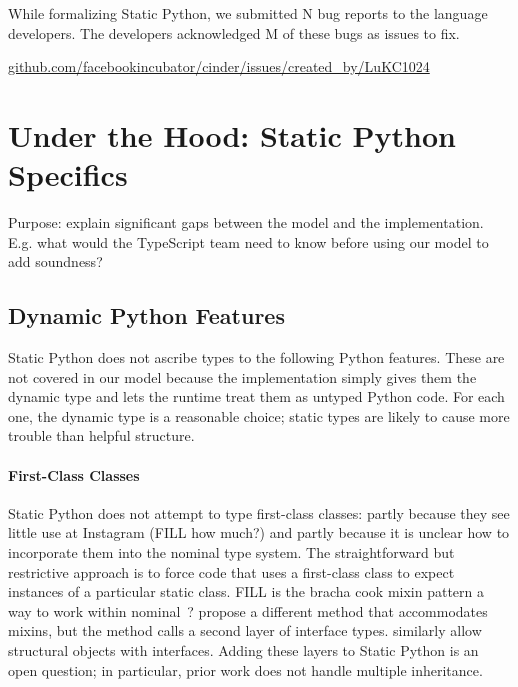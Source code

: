 \documentclass[english,cleveref,submission]{programming}
\newcommand{\shorturl}[2]{\href{#1#2}{#2}}
\newcommand{\SP}{Static Python}
\begin{document}
While formalizing Static Python, we submitted N bug reports to the language developers.
The developers acknowledged M of these bugs as issues to fix.

\begin{center}
  \shorturl{https://}{github.com/facebookincubator/cinder/issues/created\_by/LuKC1024}
\end{center}


\section{Under the Hood: Static Python Specifics}
\label{s:impl}


Purpose: explain significant gaps between the model and the implementation.
E.g. what would the TypeScript team need to know before using our model
to add soundness?

\subsection{Dynamic Python Features}

\SP{} does not ascribe types to the following Python features.
These are not covered in our model because the implementation simply
gives them the dynamic type and lets the runtime treat them as untyped
Python code.
For each one, the dynamic type is a reasonable choice; static types are
likely to cause more trouble than helpful structure.


\paragraph{First-Class Classes}

\SP{} does not attempt to type first-class classes:
partly because they see little use at Instagram (FILL how much?)
and partly because it is unclear how to incorporate them into
the nominal type system.
The straightforward but restrictive approach is to force code
that uses a first-class class to expect instances of a particular
static class.
FILL is the bracha cook mixin pattern a way to work within nominal~\cite{bc-oopsla-1990}?
\cite{fkf-popl-1998} propose a different method that accommodates mixins,
but the method calls a second layer of interface types.
\cite{mt-oopsla-2021} similarly allow structural objects with interfaces.
Adding these layers to \SP{} is an open question; in particular,
prior work does not handle multiple inheritance.
\end{document}
